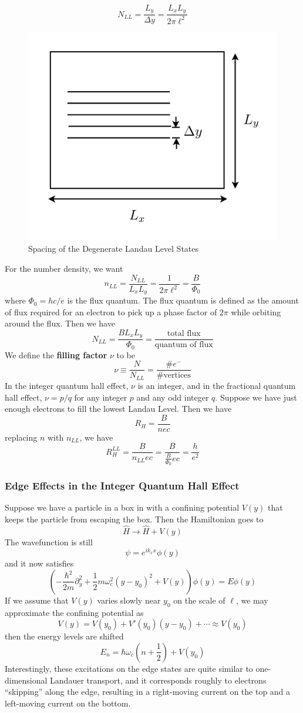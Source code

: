 \documentclass{article}
\begin{document}
	$$N_{LL}=\frac{L_y}{\Delta y}=\frac{L_xL_y}{2\pi\ell^2}$$
	\begin{figure}[h]
	\centering
		\includegraphics{landauDegeneracy.pdf}
		\caption{Spacing of the Degenerate Landau Level States}
		\label{landauDegeneracy}
	\end{figure}
	For the number density, we want
	$$n_{LL}=\frac{N_{LL}}{L_xL_y}=\frac{1}{2\pi\ell^2}=\frac{B}{\Phi_0}$$
	where $\Phi_0=hc/e$ is the flux quantum. The flux quantum is defined as the amount of flux required for an electron to pick up a phase factor of $2\pi$ while orbiting around the flux. Then we have
	$$N_{LL}=\frac{BL_xL_y}{\Phi_0}=\frac{\textrm{total flux}}{\textrm{quantum of flux}}$$ 
	We define the \textbf{filling factor} $\nu$ to be 
	$$\nu\equiv \frac{N}{N_{LL}}=\frac{\textrm{\#}e^{-}}{\textrm{\# vertices}}$$
	In the integer quantum hall effect, $\nu$ is an integer, and in the fractional quantum hall effect, $\nu=p/q$ for any integer $p$ and any odd integer $q$.
	Suppose we have just enough electrons to fill the lowest Landau Level. Then we have
	$$R_H=\frac{B}{nec}$$
	replacing $n$ with $n_{LL}$, we have 
	$$R_H^{LL}=\frac{B}{n_{LL}ec}=\frac{B}{\frac{B}{\Phi_0}ec}=\frac{h}{e^2}$$
	\subsubsection{Edge Effects in the Integer Quantum Hall Effect}
	Suppose we have a particle in a box in with a confining potential $V(y)$ that keeps the particle from escaping the box. Then the Hamiltonian goes to
	$$\hat{H}\to\hat{H}+V(y)$$
	The wavefunction is still
	$$\psi=e^{ik_xx}\phi(y)$$
	and it now satisfies
	$$\left(-\frac{\hbar^2}{2m}\partial_y^2+\frac{1}{2}m\omega_c^2(y-y_0)^2+V(y)\right)\phi(y)=E\phi(y)$$
	If we assume that $V(y)$ varies slowly near $y_0$ on the scale of $\ell$, we may approximate the confining potential as
	$$V(y)=V(y_0)+V'(y_0)(y-y_0)+\cdots\approx V(y_0)$$
	then the energy levels are shifted
	$$E_n=\hbar\omega_c\left(n+\frac{1}{2}\right)+V(y_0)$$
	Interestingly, these excitations on the edge states are quite similar to one-dimensional Landauer transport, and it corresponds roughly to electrons ``skipping'' along the edge, resulting in a right-moving current on the top and a left-moving current on the bottom.\\
	
\end{document}
